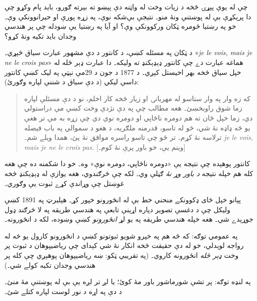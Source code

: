 \documentclass[../../../include/open-logic-section]{subfiles}
\begin{document}


چې له يوې پېړۍ څخه د زيات وخت له واټنه دې پېښو ته بېرته ګورو، بايد پام وکړو چې دا پرېکړې بې له پوښتنې ونۀ منو۔ نتيجې بې‌شکه نوې، په زړه پورې او حيرانوونکې وې۔ خو په رښتيا څومره ټکان ورکوونکې وې؟ او آيا په رښتيا يې ښودله چې پر هندسي وجدان بايد تکيه ونۀ کړو؟

د ټکان په مسئله کښې، \citet{Gouvea2011} د کانتور د دې مشهور عبارت سياق څېړي۔
«\emph{je le vois, mais je ne le crois pas}» هماغه عبارت دے چې کانتور ډېډېکنډ ته وليکه۔
دا عبارت ډېر ځله له خپل سياق څخه بهر اخيستل کېږي۔ د 1877 د جون د 29مې نېټې په ليک کښې کانتور داسې ليکي (د دې سياق د شننې لپاره \citeauthor{Gouvea2011} وګورئ):
\begin{quote}
که زه وار په وار ستاسو له مهربانۍ او زيار څخه کار اخلم، نو
د دې مسئلې لپاره زما شوق راوبخښئ۔ هغه مطالب چې په دې نژدې
وخت کښې مې دراستولي دي، زما خپل ځان ته هم دومره ناڅاپي او
دومره نوي دي چې زړه به مې تر هغې يو څه ډاډه نۀ شي، څو له
تاسو، قدرمنه ملګريه، د هغو د سموالي په باب فيصله ترلاسه
نۀ کړم۔ تر څو چې تاسو راسره موافق نۀ يئ، همدا ويلے شم۔
\emph{je le vois, mais je ne le crois pas.} [وينم يې، خو باور پرې نۀ کوم۔]
\end{quote}
کانتور پوهېده چې نتيجه يې «دومره ناڅاپي، دومره نوې» وه۔ خو دا شکمنه ده چې هغه کله هم خپله نتيجه \emph{د باور وړ نۀ} ګڼلې وي۔ لکه چې \citeauthor{Gouvea2011} څرګندوي، هغه يوازې له ډېډېکنډ څخه غوښتل چې وړاندې کړے ثبوت يې وګوري۔

پېانو خپل ځای ډکوونکے منحني خط بې له انځورونو خپور کړ۔
هېلبرټ په 1891 کښې وليکل چې د دغسې تصوير دپاره اړينې تابعې
په هندسي طريقه په لا څرګند ډول جوړېدے شي۔ هغه خپله هندسي
طريقه په يو لړ \emph{انځورونو} کښې وښوده، لکه د
 انځورونه۔

په عمومي توګه: که څه هم په خپرو شويو ثبوتونو کښې د انځورونو کارول يو څه له رواجه لوېدلي، خو له دې حقيقت څخه انکار نۀ شي کېدای چې رياضيپوهان د ثبوت پر وخت \emph{ډېر ځله} انځورونه کاروي۔ (په تقريبي ټکو: ښه رياضيپوهان پوهېږي چې کله پر هندسي وجدان تکيه کولے شي۔)

په لنډه توګه: پر تشې شورماشور باور مۀ کوئ؛ يا لږ تر لږه يې بې له پوښتنې مۀ منئ۔ د دې په اړه د نور لوست لپاره \citet{Giaquinto2007} کتلے شئ۔
\end{document}
